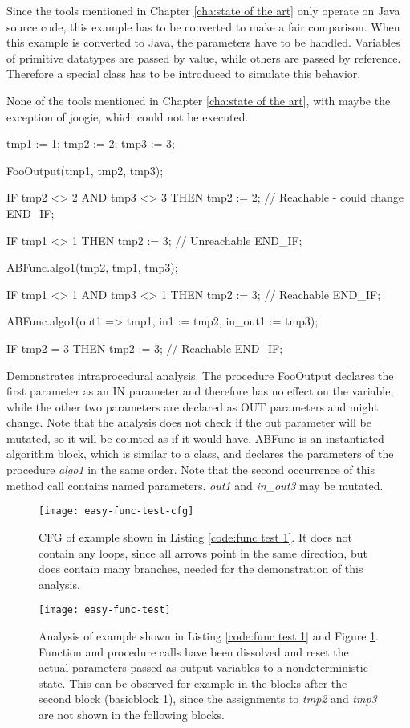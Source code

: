 Since the tools mentioned in Chapter \ref{cha:state of the art} only operate on Java source code, this example has to be converted to make a fair comparison.
When this example is converted to Java, the parameters have to be handled. Variables of primitive datatypes are passed by value, while others are passed by reference. Therefore a special class has to be introduced to simulate this behavior. 

None of the tools mentioned in Chapter \ref{cha:state of the art}, with maybe the exception of joogie, which could not be executed.


\begin{program}[h!]
	\begin{GenericCode}
tmp1 := 1;
tmp2 := 2;
tmp3 := 3;

FooOutput(tmp1, tmp2, tmp3);

IF tmp2 <> 2 AND tmp3 <> 3 THEN
	tmp2 := 2; // Reachable - could change
END_IF;

IF tmp1 <> 1 THEN
	tmp2 := 3; // Unreachable
END_IF;

ABFunc.algo1(tmp2, tmp1, tmp3);

IF tmp1 <> 1 AND tmp3 <> 1 THEN
	tmp2 := 3; // Reachable
END_IF;

ABFunc.algo1(out1 => tmp1, in1 := tmp2, in_out1 := tmp3);

IF tmp2 = 3 THEN
	tmp2 := 3; // Reachable
END_IF;	\end{GenericCode}
	\centering
	\caption{Demonstrates intraprocedural analysis. The procedure  FooOutput declares the first parameter as an IN parameter and therefore has no effect on the variable, while the other two parameters are declared as OUT parameters and might change. Note that the analysis does not check if the out parameter will be mutated, so it will be counted as if it would have. ABFunc is an instantiated algorithm block, which is similar to a class, and declares the parameters of the procedure \emph{algo1} in the same order. Note that the second occurrence of this method call contains named parameters. \emph{out1} and \emph{in\_out3} may be mutated.}
	\label{code:func test 1}
\end{program}
\begin{figure}[h!]
	\centering
	\texttt{[image: easy-func-test-cfg]}
	\caption{CFG of example shown in Listing \ref{code:func test 1}. It does not contain any loops, since all arrows point in the same direction, but does contain many branches, needed for the demonstration of this analysis.}
	\label{fig:func test 1 cfg}
\end{figure}
\begin{figure}[h!]
	\centering
	\texttt{[image: easy-func-test]}
	\caption{Analysis of example shown in Listing \ref{code:func test 1} and Figure \ref{fig:func test 1 cfg}. Function and procedure calls have been dissolved and reset the actual parameters passed as output variables to a nondeterministic state. This can be observed for example in the blocks after the second block (basicblock 1), since the assignments to \emph{tmp2} and \emph{tmp3} are not shown in the following blocks.}
	\label{fig:func test 1}
\end{figure}

